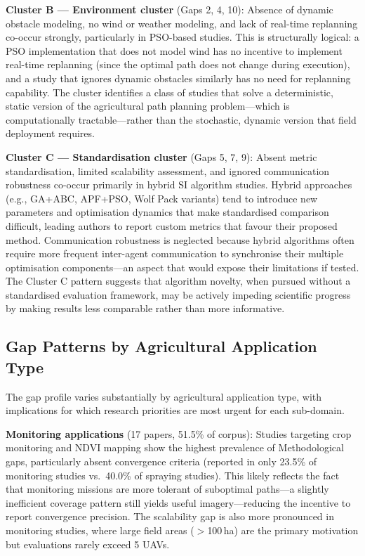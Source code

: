 \documentclass[review,3p,times]{elsarticle}
\begin{document}
\textbf{Cluster B --- Environment cluster} (Gaps 2, 4, 10): Absence of dynamic obstacle modeling, no wind or weather modeling, and lack of real-time replanning co-occur strongly, particularly in PSO-based studies. This is structurally logical: a PSO implementation that does not model wind has no incentive to implement real-time replanning (since the optimal path does not change during execution), and a study that ignores dynamic obstacles similarly has no need for replanning capability. The cluster identifies a class of studies that solve a deterministic, static version of the agricultural path planning problem---which is computationally tractable---rather than the stochastic, dynamic version that field deployment requires.

\textbf{Cluster C --- Standardisation cluster} (Gaps 5, 7, 9): Absent metric standardisation, limited scalability assessment, and ignored communication robustness co-occur primarily in hybrid SI algorithm studies. Hybrid approaches (e.g., GA+ABC, APF+PSO, Wolf Pack variants) tend to introduce new parameters and optimisation dynamics that make standardised comparison difficult, leading authors to report custom metrics that favour their proposed method. Communication robustness is neglected because hybrid algorithms often require more frequent inter-agent communication to synchronise their multiple optimisation components---an aspect that would expose their limitations if tested. The Cluster C pattern suggests that algorithm novelty, when pursued without a standardised evaluation framework, may be actively impeding scientific progress by making results less comparable rather than more informative.

\subsection{Gap Patterns by Agricultural Application Type}

The gap profile varies substantially by agricultural application type, with implications for which research priorities are most urgent for each sub-domain.

\textbf{Monitoring applications} (17 papers, 51.5\% of corpus): Studies targeting crop monitoring and NDVI mapping show the highest prevalence of Methodological gaps, particularly absent convergence criteria (reported in only 23.5\% of monitoring studies vs.\ 40.0\% of spraying studies). This likely reflects the fact that monitoring missions are more tolerant of suboptimal paths---a slightly inefficient coverage pattern still yields useful imagery---reducing the incentive to report convergence precision. The scalability gap is also more pronounced in monitoring studies, where large field areas ($>$100\,ha) are the primary motivation but evaluations rarely exceed 5 UAVs.
\end{document}
